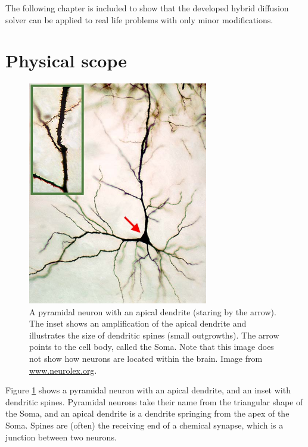 The following chapter is included to show that the developed hybrid diffusion solver can be applied to real life problems with only minor modifications.

\section{Physical scope}

\begin{figure}[H]
 \centering
 \includegraphics[width=0.7\textwidth]{Figures/Cochlear_nucleus_multipolar_cell.jpg}
 \caption[Pyramidal neuron]{A pyramidal neuron with an apical dendrite (staring by the arrow). The inset shows an amplification of the apical dendrite and illustrates the size of dendritic spines (small outgrowths). The arrow points to the cell body, called the Soma. Note that this image does not show how neurons are located within the brain. Image from \url{www.neurolex.org}.}
 \label{application:pyramidal_neuron}
\end{figure}

Figure \ref{application:pyramidal_neuron} shows a pyramidal neuron with an apical dendrite, and an inset with dendritic spines. 
Pyramidal neurons take their name from the triangular shape of the Soma, and an apical dendrite is a dendrite springing from the apex of the Soma. 
Spines are (often) the receiving end of a chemical synapse, which is a junction between two neurons. \\


